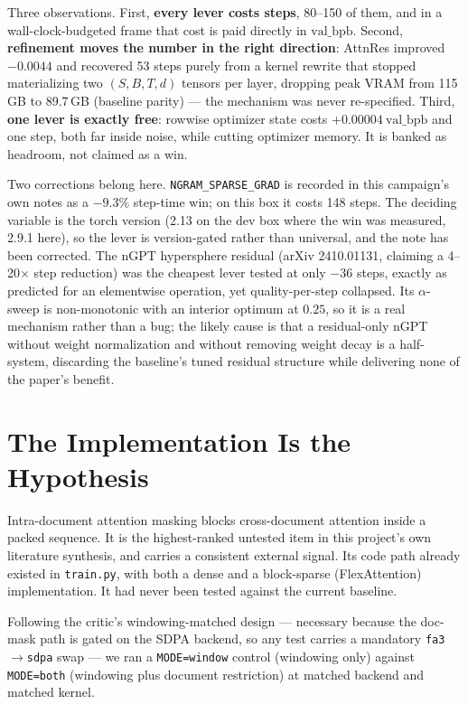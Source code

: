 \documentclass{article}
\newcommand{\valbpb}{\mathrm{val\_bpb}}
\begin{document}
Three observations. First, \textbf{every lever costs steps}, 80--150 of them, and in a wall-clock-budgeted frame that cost is paid directly in $\valbpb$. Second, \textbf{refinement moves the number in the right direction}: AttnRes improved $-0.0044$ and recovered 53 steps purely from a kernel rewrite that stopped materializing two $(S,B,T,d)$ tensors per layer, dropping peak VRAM from 115\,GB to 89.7\,GB (baseline parity) --- the mechanism was never re-specified. Third, \textbf{one lever is exactly free}: rowwise optimizer state costs $+0.00004\ \valbpb$ and one step, both far inside noise, while cutting optimizer memory. It is banked as headroom, not claimed as a win.

Two corrections belong here. \texttt{NGRAM\_SPARSE\_GRAD} is recorded in this campaign's own notes as a $-9.3\%$ step-time win; on this box it costs 148 steps. The deciding variable is the torch version (2.13 on the dev box where the win was measured, 2.9.1 here), so the lever is version-gated rather than universal, and the note has been corrected. The nGPT hypersphere residual (arXiv 2410.01131, claiming a 4--20$\times$ step reduction) was the cheapest lever tested at only $-36$ steps, exactly as predicted for an elementwise operation, yet quality-per-step collapsed. Its $\alpha$-sweep is non-monotonic with an interior optimum at $0.25$, so it is a real mechanism rather than a bug; the likely cause is that a residual-only nGPT without weight normalization and without removing weight decay is a half-system, discarding the baseline's tuned residual structure while delivering none of the paper's benefit.

\section{The Implementation Is the Hypothesis}
\label{sec:docmask}
Intra-document attention masking blocks cross-document attention inside a packed sequence. It is the highest-ranked untested item in this project's own literature synthesis, and carries a consistent external signal. Its code path already existed in \texttt{train.py}, with both a dense and a block-sparse (FlexAttention) implementation. It had never been tested against the current baseline.

Following the critic's windowing-matched design --- necessary because the doc-mask path is gated on the SDPA backend, so any test carries a mandatory \texttt{fa3}$\to$\texttt{sdpa} swap --- we ran a \texttt{MODE=window} control (windowing only) against \texttt{MODE=both} (windowing plus document restriction) at matched backend and matched kernel.
\end{document}
